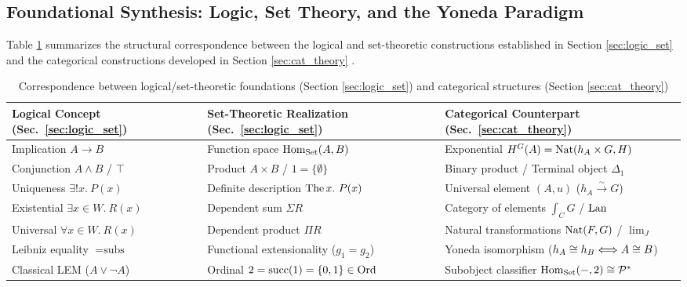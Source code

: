 \documentclass[10pt,a4paper]{article}
\begin{document}
\subsection{Foundational Synthesis: Logic, Set Theory, and the Yoneda Paradigm}\label{sec:synthesis}
Table \ref{tab:synthesis} summarizes the structural correspondence between the logical and set-theoretic constructions established in Section \ref{sec:logic_set} and the categorical constructions developed in Section \ref{sec:cat_theory} \cite{MacLane1998,Awodey2010,Riehl2016,Borceux1994}.

\begin{table}[H]
\centering
{\small
\setlength{\tabcolsep}{1.5pt}
\caption{Correspondence between logical/set-theoretic foundations (Section \ref{sec:logic_set}) and categorical structures (Section \ref{sec:cat_theory})}
\label{tab:synthesis}
\begin{tabular}{|l|l|l|}
\hline
\textbf{Logical Concept (Sec.\ \ref{sec:logic_set})} & \textbf{Set-Theoretic Realization (Sec.\ \ref{sec:logic_set})} & \textbf{Categorical Counterpart (Sec.\ \ref{sec:cat_theory})} \\ \hline
\hline
Implication $A \to B$ & Function space ${\textrm{Hom}}_{\textrm{Set}}(A, B)$ & Exponential $H^G(A) = {\textrm{Nat}}(h_A \times G, H)$ \\ \hline
Conjunction $A \land B$ / $\top$ & Product $A \times B$ / $1 = \{\emptyset\}$ & Binary product / Terminal object $\Delta_1$ \\ \hline
Uniqueness $\exists !x.\ P(x)$ & Definite description ${\textrm{The\,}} x.\ P(x)$ & Universal element $(A, u)$ ($h_A \xrightarrow{\sim} G$) \\ \hline
Existential $\exists x \in W.\ R(x)$ & Dependent sum $\Sigma R$ & Category of elements $\int_C G$ / ${\mathrm{Lan}}$ \\ \hline
Universal $\forall x \in W.\ R(x)$ & Dependent product $\Pi R$ & Natural transformations ${\textrm{Nat}}(F, G)$ / $\lim_J$ \\ \hline
Leibniz equality $=\textrm{subs}$ & Functional extensionality ($g_1 = g_2$) & Yoneda isomorphism ($h_A \cong h_B \Longleftrightarrow A \cong B$) \\ \hline
Classical LEM ($A \lor \neg A$) & Ordinal $2 = {\textrm{succ}}(1) = \{0, 1\} \in {\textrm{Ord}}$ & Subobject classifier ${\textrm{Hom}}_{\textrm{Set}}(-, 2) \cong {\mathcal{P}}^*$ \\ \hline
\end{tabular}}
\end{table}
\end{document}
